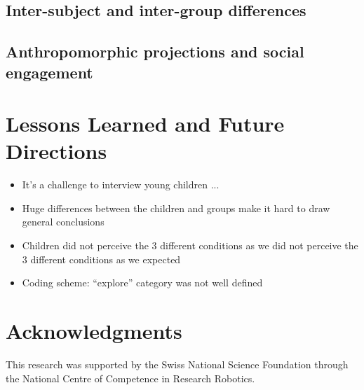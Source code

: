 \documentclass{sig-alternate}
\begin{document}
\subsection{Inter-subject and inter-group differences}

\subsection{Anthropomorphic projections and social engagement}

\section{Lessons Learned and Future Directions}

\begin{itemize}
\item It’s a challenge to interview young children ... 
\item Huge differences between the children and groups make it hard to draw general conclusions
\item Children did not perceive the 3 different conditions as we did not perceive the 3 different conditions as we expected
\item Coding scheme: “explore” category was not well defined
\end{itemize}




\section*{Acknowledgments}

This research was supported by the Swiss National Science Foundation through the
National Centre of Competence in Research Robotics.




\balancecolumns
\end{document}
